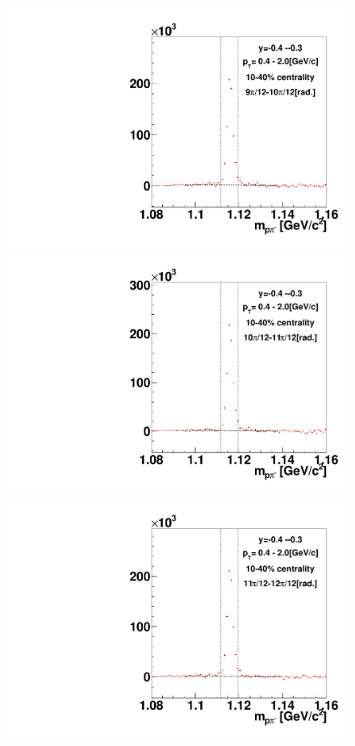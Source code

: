 \begin{figure}[h]
\includegraphics[width=0.14\linewidth]{chapterX/fig/ld_v1_sig/kf_ptslice0_cent1_ld_flow_phi10_rap8.pdf}
\includegraphics[width=0.14\linewidth]{chapterX/fig/ld_v1_sig/kf_ptslice0_cent1_ld_flow_phi11_rap8.pdf}
\includegraphics[width=0.14\linewidth]{chapterX/fig/ld_v1_sig/kf_ptslice0_cent1_ld_flow_phi12_rap8.pdf}


\end{figure}
